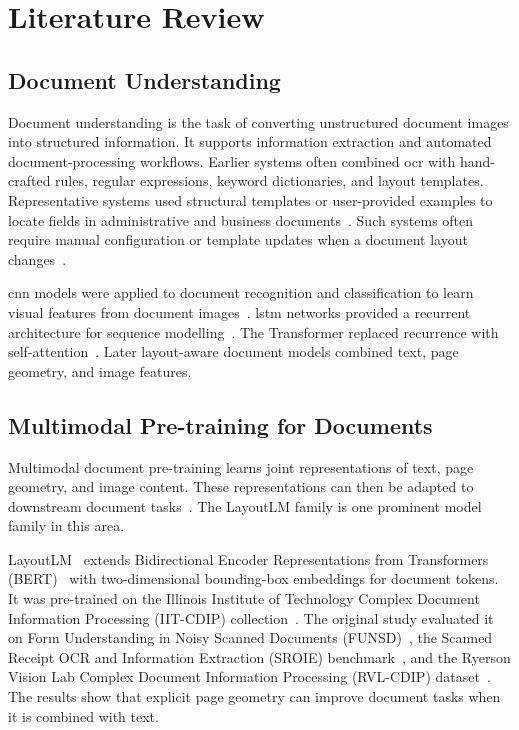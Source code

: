 \chapter{Literature Review}
\label{ch:literature}

\section{Document Understanding}
\label{sec:doc_understanding}

Document understanding is the task of converting unstructured document images
into structured information. It supports information extraction and automated
document-processing workflows. Earlier systems often combined \gls{ocr} with
hand-crafted rules, regular expressions, keyword dictionaries, and layout
templates. Representative systems used structural templates or user-provided
examples to locate fields in administrative and business
documents~\cite{rusinol2013field,schuster2013intellix}. Such systems often
require manual configuration or template updates when a document layout
changes~\cite{rusinol2013field,schuster2013intellix,layoutlm}.

\Gls{cnn} models were applied to document recognition and classification to
learn visual features from document images~\cite{lecun1998gradient,rvlcdip}.
\Gls{lstm} networks provided a recurrent architecture for sequence
modelling~\cite{hochreiter1997lstm}. The Transformer replaced recurrence with
self-attention~\cite{vaswani2017attention}. Later layout-aware document models
combined text, page geometry, and image features.

\section{Multimodal Pre-training for Documents}
\label{sec:multimodal}

Multimodal document pre-training learns joint representations of text, page
geometry, and image content. These representations can then be adapted to
downstream document tasks~\cite{layoutlm,layoutlmv2,layoutlmv3}. The LayoutLM
family is one prominent model family in this area.

LayoutLM~\cite{layoutlm} extends Bidirectional Encoder Representations from
Transformers (BERT)~\cite{transformers} with
two-dimensional bounding-box embeddings for document tokens. It was
pre-trained on the Illinois Institute of Technology Complex Document
Information Processing (IIT-CDIP) collection~\cite{iitcdip}. The original
study evaluated it on Form
Understanding in Noisy Scanned Documents (FUNSD)~\cite{funsd}, the Scanned
Receipt OCR and Information Extraction (SROIE) benchmark~\cite{sroie}, and the
Ryerson Vision Lab Complex Document Information Processing (RVL-CDIP)
dataset~\cite{rvlcdip}. The results show that explicit page geometry can
improve document tasks when it is combined with text.

